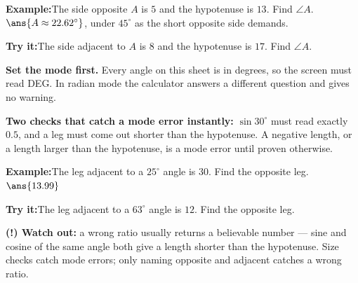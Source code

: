 \documentclass[12pt]{article}
\begin{document}
\begin{examplebox}
\textbf{Example:}\quad The side opposite $A$ is $5$ and the hypotenuse is $13$.
Find $\angle A$.
$\ans{A \approx 22.62^\circ}$, under $45^\circ$ as the short opposite side
demands.
\end{examplebox}

\begin{tryitbox}
\textbf{Try it:}\quad The side adjacent to $A$ is $8$ and the hypotenuse is
$17$. Find $\angle A$.\\[2pt]
\end{tryitbox}


\begin{formulabox}
\textbf{Set the mode first.} Every angle on this sheet is in degrees, so the
screen must read DEG. In radian mode the calculator answers a different question
and gives no warning.\par
\smallskip
\textbf{Two checks that catch a mode error instantly:} $\sin 30^\circ$ must
read exactly $0.5$, and a leg must come out shorter than the hypotenuse. A
negative length, or a length larger than the hypotenuse, is a mode error until
proven otherwise.
\end{formulabox}

\begin{examplebox}
\textbf{Example:}\quad The leg adjacent to a $25^\circ$ angle is $30$. Find the
opposite leg.
$\ans{13.99}$
\end{examplebox}

\begin{tryitbox}
\textbf{Try it:}\quad The leg adjacent to a $63^\circ$ angle is $12$. Find the
opposite leg.\\[2pt]
\end{tryitbox}

\begin{watchoutbox}
\textbf{(!) Watch out:} a wrong ratio usually returns a believable number ---
sine and cosine of the same angle both give a length shorter than the
hypotenuse. Size checks catch mode errors; only naming opposite and adjacent
catches a wrong ratio.
\end{watchoutbox}
\end{document}
